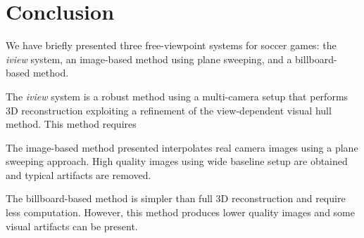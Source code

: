 \section{Conclusion}
We have briefly presented three free-viewpoint systems for soccer games: the \textit{iview} system, an image-based method using 
plane sweeping, and a billboard-based method.

The \textit{iview} system is a robust method using a multi-camera setup that performs 3D reconstruction exploiting a refinement 
of the view-dependent visual hull method.
This method requires 

The image-based method presented interpolates real camera images using a plane sweeping approach.
High quality images using wide baseline setup are obtained and typical artifacts are removed.

The billboard-based method is simpler than full 3D reconstruction and require less computation.
However, this method produces lower quality images and some visual artifacts can be present.


